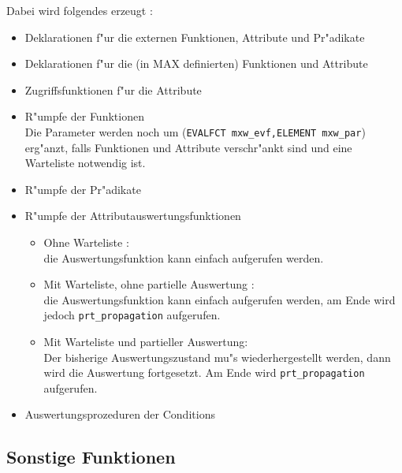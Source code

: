 Dabei wird folgendes erzeugt :
\begin{itemize}
\item Deklarationen f"ur die externen Funktionen, Attribute und Pr"adikate
\item Deklarationen f"ur die (in MAX definierten) Funktionen und Attribute
\item Zugriffsfunktionen f"ur die Attribute

\item R"umpfe der Funktionen\\
Die Parameter werden noch um ({\tt EVALFCT mxw\_evf,ELEMENT mxw\_par})
erg"anzt, falls Funktionen und Attribute verschr"ankt sind und
eine Warteliste notwendig ist.

\item R"umpfe der Pr"adikate

\item R"umpfe der Attributauswertungsfunktionen\\

\begin{itemize}
\item Ohne Warteliste :\\
die Auswertungsfunktion kann einfach aufgerufen werden.
\item Mit Warteliste, ohne partielle Auswertung :\\
die Auswertungsfunktion kann einfach aufgerufen werden, am Ende wird
jedoch {\tt prt\_propagation} aufgerufen.
\item
Mit Warteliste und partieller Auswertung:\\
Der bisherige Auswertungszustand mu"s wiederhergestellt werden, dann wird die
Auswertung fortgesetzt. Am Ende wird {\tt prt\_propagation} aufgerufen.
\end{itemize}

\item Auswertungsprozeduren der Conditions
\end{itemize}


\subsection{Sonstige Funktionen}

